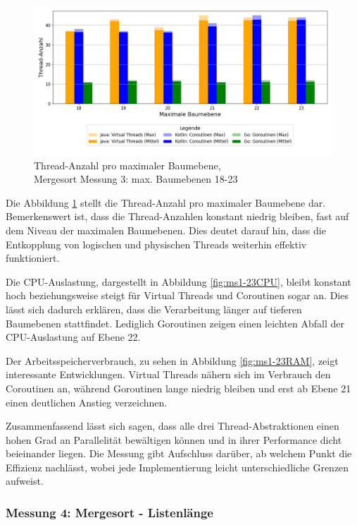 \documentclass[fontsize=12pt,paper=a4,twoside=semi,parskip=half-,headsepline,headinclude]{scrreprt}
\begin{document}
\begin{figure}[H]
	\centering
	\includegraphics[scale=0.5]{figures/mergesort/Maximalebauebenen1-23_vcg/num_threads_bar_plot.png}
	\caption{Thread-Anzahl pro maximaler Baumebene,\\ Mergesort Messung 3: max. Baumebenen 18-23}
	\label{fig:ms1-23Threads}
\end{figure}

Die Abbildung \ref{fig:ms1-23Threads} stellt die Thread-Anzahl pro maximaler Baumebene dar. Bemerkenswert ist, dass die Thread-Anzahlen konstant niedrig bleiben, fast auf dem Niveau der maximalen Baumebenen. Dies deutet darauf hin, dass die Entkopplung von logischen und physischen Threads weiterhin effektiv funktioniert.

Die CPU-Auslastung, dargestellt in Abbildung \ref{fig:ms1-23CPU}, bleibt konstant hoch beziehungsweise steigt für Virtual Threads und Coroutinen sogar an. Dies lässt sich dadurch erklären, dass die Verarbeitung länger auf tieferen Baumebenen stattfindet. Lediglich Goroutinen zeigen einen leichten Abfall der CPU-Auslastung auf Ebene 22.

Der Arbeitsspeicherverbrauch, zu sehen in Abbildung \ref{fig:ms1-23RAM}, zeigt interessante Entwicklungen. Virtual Threads nähern sich im Verbrauch den Coroutinen an, während Goroutinen lange niedrig bleiben und erst ab Ebene 21 einen deutlichen Anstieg verzeichnen.

Zusammenfassend lässt sich sagen, dass alle drei Thread-Abstraktionen einen hohen Grad an Parallelität bewältigen können und in ihrer Performance dicht beieinander liegen. Die Messung gibt Aufschluss darüber, ab welchem Punkt die Effizienz nachlässt, wobei jede Implementierung leicht unterschiedliche Grenzen aufweist.

\subsubsection{Messung 4: Mergesort - Listenlänge}
\end{document}
